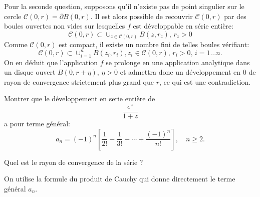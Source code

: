 \documentclass[a4paper, 12pt]{amsart}
\begin{document}
Pour la seconde question, supposons qu'il n'existe pas de point singulier sur le cercle $\mathcal{C}(0,r)=\partial B(0,r).$ Il est alors possible de recouvrir $\mathcal{C}(0,r)$ par des boules ouvertes non vides sur lesquelles $f$ est développable en série entière:
\[
\mathcal{C}(0,r) \subset \cup_{z \in \mathcal{C}(0,r)} B(z,r_z), \, r_z > 0
\]
Comme $\mathcal{C}(0,r)$ est compact, il existe un nombre fini de telles boules vérifiant:
\[
\mathcal{C}(0,r) \subset \cup_{i=1}^n B(z_i, r_i), z_i \in \mathcal{C}(0,r), \, r_i > 0, \, i=1\dots n.
\]
On en déduit que l'application $f$ se prolonge en une application analytique dans un disque ouvert $B\left(0,r+\eta\right),\, \eta > 0$ et admettra donc un développement en $0$ de rayon de convergence strictement plus grand que $r$, ce qui est une contradiction.
\begin{fex}
Montrer que le développement en serie entière de 
\[\frac{e^z}{1+z}\]
a pour terme général:
\[a_n=(-1)^n \left[\frac{1}{2!} - \frac{1}{3!} + \cdots + \frac{(-1)^n}{n!}\right], \quad n \geq 2.\]

Quel est le rayon de convergence de la série ?
\end{fex}
On utilise la formule du produit de Cauchy qui donne directement le terme général $a_n.$
\end{document}
